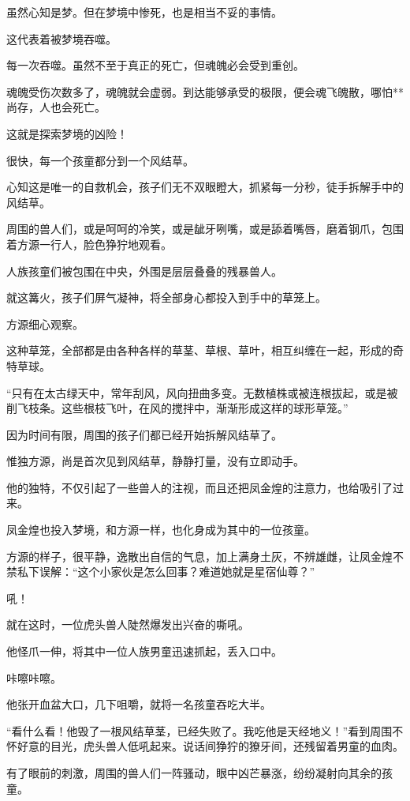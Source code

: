 \begin{this_body}
虽然心知是梦。但在梦境中惨死，也是相当不妥的事情。

这代表着被梦境吞噬。

每一次吞噬。虽然不至于真正的死亡，但魂魄必会受到重创。

魂魄受伤次数多了，魂魄就会虚弱。到达能够承受的极限，便会魂飞魄散，哪怕**尚存，人也会死亡。

这就是探索梦境的凶险！

很快，每一个孩童都分到一个风结草。

心知这是唯一的自救机会，孩子们无不双眼瞪大，抓紧每一分秒，徒手拆解手中的风结草。

周围的兽人们，或是呵呵的冷笑，或是龇牙咧嘴，或是舔着嘴唇，磨着钢爪，包围着方源一行人，脸色狰狞地观看。

人族孩童们被包围在中央，外围是层层叠叠的残暴兽人。

就这篝火，孩子们屏气凝神，将全部身心都投入到手中的草笼上。

方源细心观察。

这种草笼，全部都是由各种各样的草茎、草根、草叶，相互纠缠在一起，形成的奇特草球。

“只有在太古绿天中，常年刮风，风向扭曲多变。无数植株或被连根拔起，或是被削飞枝条。这些根枝飞叶，在风的搅拌中，渐渐形成这样的球形草笼。”

因为时间有限，周围的孩子们都已经开始拆解风结草了。

惟独方源，尚是首次见到风结草，静静打量，没有立即动手。

他的独特，不仅引起了一些兽人的注视，而且还把凤金煌的注意力，也给吸引了过来。

凤金煌也投入梦境，和方源一样，也化身成为其中的一位孩童。

方源的样子，很平静，逸散出自信的气息，加上满身土灰，不辨雄雌，让凤金煌不禁私下误解：“这个小家伙是怎么回事？难道她就是星宿仙尊？”

吼！

就在这时，一位虎头兽人陡然爆发出兴奋的嘶吼。

他怪爪一伸，将其中一位人族男童迅速抓起，丢入口中。

咔嚓咔嚓。

他张开血盆大口，几下咀嚼，就将一名孩童吞吃大半。

“看什么看！他毁了一根风结草茎，已经失败了。我吃他是天经地义！”看到周围不怀好意的目光，虎头兽人低吼起来。说话间狰狞的獠牙间，还残留着男童的血肉。

有了眼前的刺激，周围的兽人们一阵骚动，眼中凶芒暴涨，纷纷凝射向其余的孩童。


\end{this_body}
